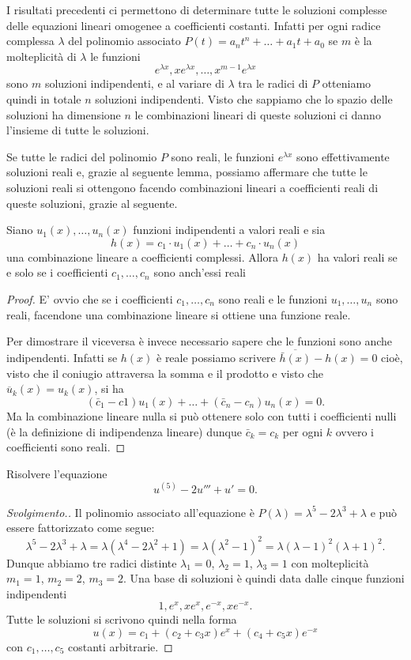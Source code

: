 I risultati precedenti ci permettono di determinare tutte le soluzioni complesse delle equazioni 
lineari omogenee a coefficienti costanti. Infatti per ogni radice complessa $\lambda$ del polinomio 
associato $P(t) = a_n t^n + \dots + a_1 t + a_0$ se $m$ è la molteplicità di $\lambda$ 
le funzioni 
\[
  e^{\lambda x}, x e^{\lambda x}, \dots, x^{m-1} e^{\lambda x}  
\]
sono $m$ soluzioni indipendenti, e al variare di $\lambda$ tra le radici di $P$ otteniamo 
quindi in totale $n$ soluzioni indipendenti. Visto che 
sappiamo che lo spazio delle soluzioni ha dimensione $n$ le combinazioni lineari di queste 
soluzioni ci danno l'insieme di tutte le soluzioni.

Se tutte le radici del polinomio $P$ sono reali, le funzioni $e^{\lambda x}$ sono effettivamente 
soluzioni reali e, grazie al seguente lemma, possiamo affermare che tutte le soluzioni reali 
si ottengono facendo combinazioni lineari a coefficienti reali di queste soluzioni, 
grazie al seguente.

\begin{lemma}\label{lm:combinazioni_reali}
Siano $u_1(x), \dots, u_n(x)$ funzioni indipendenti a valori reali
e sia 
\[
  h(x) = c_1 \cdot u_1(x) + \dots + c_n \cdot u_n(x)
\]
una combinazione lineare a coefficienti complessi.
Allora $h(x)$ ha valori reali se e solo se i coefficienti $c_1, \dots, c_n$ 
sono anch'essi reali
\end{lemma}
%
\begin{proof}
E' ovvio che se i coefficienti $c_1,\dots,c_n$ sono reali e le funzioni $u_1, \dots, u_n$ sono reali,
facendone una combinazione lineare si ottiene una funzione reale.

Per dimostrare il viceversa è invece necessario sapere che le funzioni sono anche indipendenti. Infatti 
se $h(x)$ è reale possiamo scrivere $\overline{\bar h(x)} - h(x) = 0$ cioè, visto che il coniugio
attraversa la somma e il prodotto e visto che $\overline u_k(x) = u_k(x)$, si ha 
\[
 (\bar c_1 - c1) u_1(x) + \dots + (\bar c_n-c_n) u_n(x)=0.
\]
Ma la combinazione lineare nulla si può ottenere solo con tutti i coefficienti nulli 
(è la definizione di indipendenza lineare) dunque $\bar c_k = c_k$ per ogni $k$ ovvero 
i coefficienti sono reali.
\end{proof}

\begin{example}
Risolvere l'equazione
\[
  u^{(5)} - 2 u''' + u' = 0.  
\]
\end{example}
%
\begin{proof}[Svolgimento.]
Il polinomio associato all'equazione è $P(\lambda) = \lambda^5 - 2\lambda^3 + \lambda$ 
e può essere fattorizzato come segue:
\[
  \lambda^5 - 2\lambda^3 + \lambda
  = \lambda(\lambda^4-2\lambda^2+1)
  = \lambda(\lambda^2-1)^2
  = \lambda(\lambda-1)^2(\lambda+1)^2.
\]
Dunque abbiamo tre radici distinte $\lambda_1=0$, $\lambda_2=1$, $\lambda_3=1$ con molteplicità 
$m_1=1$, $m_2=2$, $m_3=2$.
Una base di soluzioni è quindi data dalle cinque funzioni indipendenti
\[
 1, e^x, xe^x, e^{-x}, xe^{-x}.
\]
Tutte le soluzioni si scrivono quindi nella forma
\[
  u(x) = c_1 + (c_2 + c_3 x)e^x + (c_4 + c_5 x) e^{-x}  
\]
con $c_1, \dots, c_5$ costanti arbitrarie.
\end{proof}

